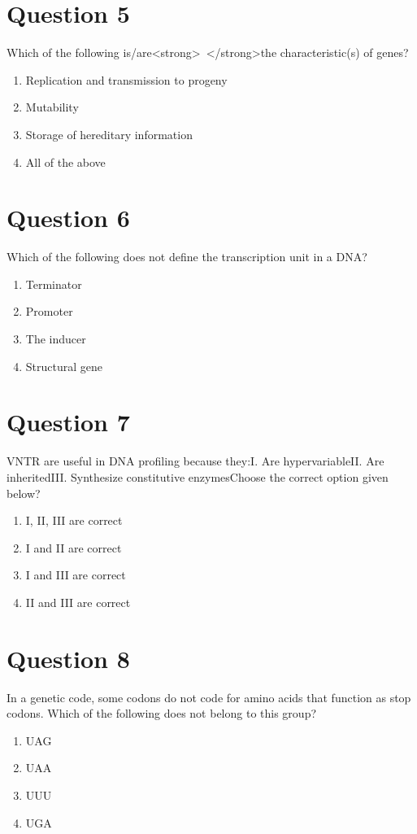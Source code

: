 \documentclass{article}
\begin{document}
\section*{Question 5}
Which of the following is/are<strong> </strong>the characteristic(s) of genes?
\begin{enumerate}[label=(\alph*)]
\item Replication and transmission to progeny
\item Mutability
\item Storage of hereditary information
\item All of the above
\end{enumerate}
\newpage
\section*{Question 6}
Which of the following does not define the transcription unit in a DNA?
\begin{enumerate}[label=(\alph*)]
\item Terminator
\item Promoter
\item The inducer
\item Structural gene
\end{enumerate}
\newpage
\section*{Question 7}
VNTR are useful in DNA profiling because they:I. Are hypervariableII. Are inheritedIII. Synthesize constitutive enzymesChoose the correct option given below?
\begin{enumerate}[label=(\alph*)]
\item I, II, III are correct
\item I and II are correct
\item I and III are correct
\item II and III are correct
\end{enumerate}
\newpage
\section*{Question 8}
In a genetic code, some codons do not code for amino acids that function as stop codons. Which of the following does not belong to this group?
\begin{enumerate}[label=(\alph*)]
\item UAG
\item UAA
\item UUU
\item UGA
\end{enumerate}
\newpage
\end{document}
